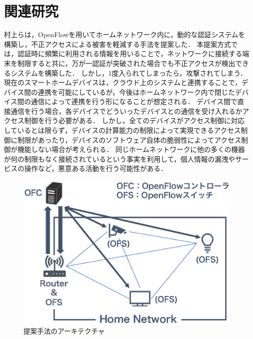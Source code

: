 \documentclass[a4paper,10pt,twocolumn,uplatex]{jsarticle}
\begin{document}
\section{関連研究}
村上らは，OpenFlowを用いてホームネットワーク内に，動的な認証システムを構築し，不正アクセスによる被害を軽減する手法を提案した\cite{related}．
本提案方式では，認証時に頻繁に利用される情報を用いることで，ネットワークに接続する端末を制限すると共に，万が一認証が突破された場合でも不正アクセスが検出できるシステムを構築した．
しかし，1度入られてしまったら，攻撃されてしまう．
現在のスマートホームデバイスは，クラウド上のシステムと連携することで，デバイス間の連携を可能にしているが，今後はホームネットワーク内で閉じたデバイス間の通信によって連携を行う形になることが想定される\cite{d2d}．
デバイス間で直接通信を行う場合，各デバイスでどういったデバイスとの通信を受け入れるかアクセス制御を行う必要がある．
しかし，全てのデバイスがアクセス制御に対応しているとは限らず，デバイスの計算能力の制限によって実現できるアクセス制御に制限があったり，デバイスのソフトウェア自体の脆弱性によってアクセス制御が機能しない場合が考えられる．
同じホームネットワークに他の多くの機器が何の制限もなく接続されているという事実を利用して，個人情報の漏洩やサービスの操作など，悪意ある活動を行う可能性がある\cite{disap}．

\begin{figure}[!tb]
  \centering
  \includegraphics[width=\linewidth]{img/architecture.eps}
  \caption{提案手法のアーキテクチャ}
  \label{fig:architecture}
\end{figure}

\end{document}
